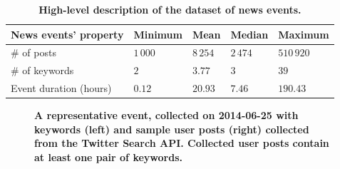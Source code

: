\documentclass[10pt,letterpaper]{article}
\begin{document}
\begin{table}[h]
  \centering
  \begin{tabular}{@{}lllll@{}}
    \toprule
    \textbf{News events' property} & \textbf{Minimum} & \textbf{Mean} & \textbf{Median} & \textbf{Maximum} \\ \midrule
    \# of posts & $1\,000$ & $8\,254$ & $2\,474$ & $510\,920$ \\
    \# of keywords & $2$ & $3.77$ & $3$ & $39$ \\
    Event duration (hours) & $0.12$ & $20.93$ & $7.46$ & $190.43$ \\ \bottomrule
  \end{tabular}
  \caption{\bf High-level description of the dataset of news events.} \label{table:dataset-stats}

\end{table}

\begin{figure}[h]
  \caption{\textbf{A representative event, collected on 2014-06-25
      with keywords (left) and sample user posts (right) collected
      from the Twitter Search API. Collected user posts contain at
      least one pair of keywords. }}
  \label{fig:components}
\end{figure}
\end{document}
